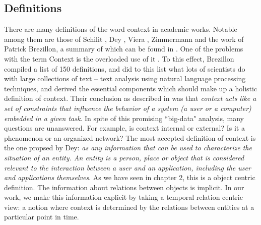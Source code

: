 \subsection{Definitions}
There are many definitions of the word context in academic works. Notable among them are those of Schilit \cite{schilit1994context}, Dey \cite{dey2001understanding}, Viera \cite{vieira2011designing}, Zimmermann \cite{zimmermann2007operational} and the work of Patrick Brezillon, a summary of which can be found in \cite{mostefaoui2004context}. One of the problems with the term Context is the overloaded use of it \cite{henricksen2002modeling}. To this effect, Brezillon compiled a list of 150 definitions, and did to this list what lots of scientists do with large collections of text -- text analysis using natural language processing techniques, and derived the essential components which should make up a holistic definition of context. Their conclusion as described in \cite{bazire2005understanding} was that \textit{context acts like a set of constraints that influence the behavior of a system (a user or a computer) embedded in a given task}. In spite of this promising ``big-data" analysis, many questions are unanswered. For example, is context internal or external? Is it a phenomenon or an organized network? The most accepted definition of context is the one propsed by Dey: \textit{as any information that can be used to characterize the situation of an entity. An entity is a person, place or object that is considered relevant to the interaction between a user and an application, including the user and applications themselves}. As we have seen in chapter 2, this is a object centric definition. The information about relations between objects is implicit. In our work, we make this information explicit by taking a temporal relation centric view: a notion where context is determined by the relations between entities at a particular point in time.

